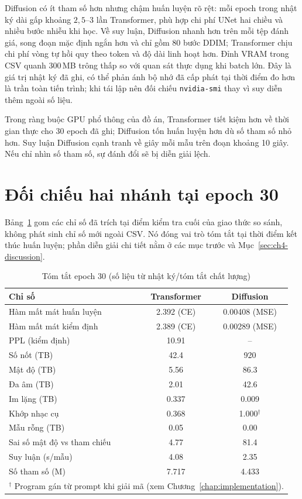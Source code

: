 Diffusion có ít tham số hơn nhưng chậm huấn luyện rõ rệt: mỗi epoch trong nhật ký dài gấp khoảng $2{,}5$--$3$ lần Transformer, phù hợp chi phí UNet hai chiều và nhiều bước nhiễu khi học. Về suy luận, Diffusion nhanh hơn trên mỗi tệp đánh giá, song đoạn mặc định ngắn hơn và chỉ gồm 80 bước DDIM; Transformer chịu chi phí vòng tự hồi quy theo token và độ dài linh hoạt hơn. Đỉnh VRAM trong CSV quanh 300\,MB trông thấp so với quan sát thực dụng khi batch lớn. Đây là giá trị nhật ký đã ghi, có thể phản ánh bộ nhớ đã cấp phát tại thời điểm đo hơn là trần toàn tiến trình; khi tái lập nên đối chiếu \texttt{nvidia-smi} thay vì suy diễn thêm ngoài số liệu.

Trong ràng buộc GPU phổ thông của đồ án, Transformer tiết kiệm hơn về thời gian thực cho 30 epoch đã ghi; Diffusion tốn huấn luyện hơn dù số tham số nhỏ hơn. Suy luận Diffusion cạnh tranh về giây mỗi mẫu trên đoạn khoảng 10 giây. Nếu chỉ nhìn số tham số, sự đánh đổi sẽ bị diễn giải lệch.

\section{Đối chiếu hai nhánh tại epoch 30}
\label{sec:ch4-ep30}

Bảng~\ref{tab:ch4-ep30} gom các chỉ số đã trích tại điểm kiểm tra cuối của giao thức so sánh, không phát sinh chỉ số mới ngoài CSV. Nó đóng vai trò tóm tắt tại thời điểm kết thúc huấn luyện; phần diễn giải chi tiết nằm ở các mục trước và Mục~\ref{sec:ch4-discussion}.

\begin{table}[htbp]
\centering
\caption{Tóm tắt epoch 30 (số liệu từ nhật ký/tóm tắt chất lượng)}
\label{tab:ch4-ep30}
\begin{tabular}{lcc}
\toprule
Chỉ số & Transformer & Diffusion \\
\midrule
Hàm mất mát huấn luyện & 2.392 (CE) & 0.00408 (MSE) \\
Hàm mất mát kiểm định & 2.389 (CE) & 0.00289 (MSE) \\
PPL (kiểm định) & 10.91 & -- \\
Số nốt (TB) & 42.4 & 920 \\
Mật độ (TB) & 5.56 & 86.3 \\
Đa âm (TB) & 2.01 & 42.6 \\
Im lặng (TB) & 0.337 & 0.009 \\
Khớp nhạc cụ & 0.368 & 1.000$^{\dagger}$ \\
Mẫu rỗng (TB) & 0.05 & 0.00 \\
Sai số mật độ vs tham chiếu & 4.77 & 81.4 \\
Suy luận (s/mẫu) & 4.08 & 2.35 \\
Số tham số (M) & 7.717 & 4.433 \\
\bottomrule
\multicolumn{3}{l}{\footnotesize $^{\dagger}$ Program gán từ prompt khi giải mã (xem Chương~\ref{chap:implementation}).}
\end{tabular}
\end{table}

